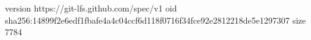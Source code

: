 version https://git-lfs.github.com/spec/v1
oid sha256:14899f2e6edf1fbafe4a4c04ccf6d118f0716f34fce92e2812218de5e1297307
size 7784
